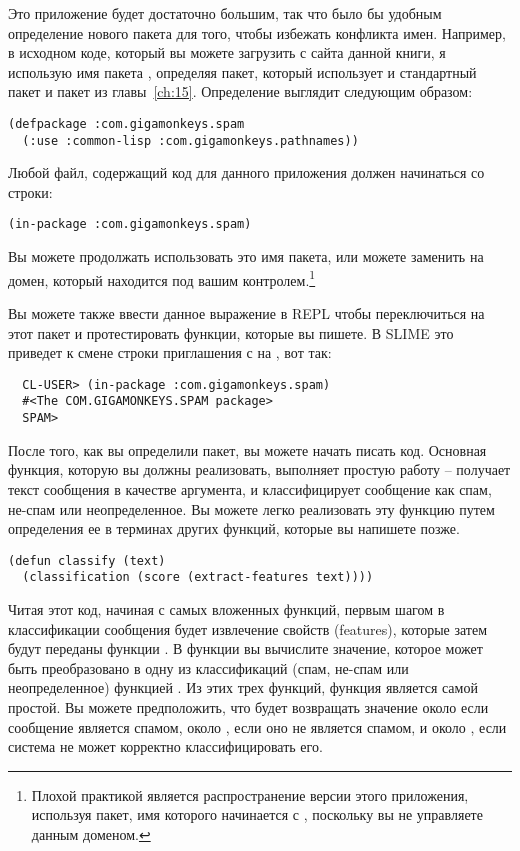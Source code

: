 Это приложение будет достаточно большим, так что было бы удобным определение нового пакета
для того, чтобы избежать конфликта имен.  Например, в исходном коде, который вы можете
загрузить с сайта данной книги, я использую имя пакета ,
определяя пакет, который использует и стандартный пакет  и пакет
 из главы~\ref{ch:15}.  Определение выглядит следующим
образом:

\begin{lstlisting}
(defpackage :com.gigamonkeys.spam
  (:use :common-lisp :com.gigamonkeys.pathnames))
\end{lstlisting}

Любой файл, содержащий код для данного приложения должен начинаться со строки:

\begin{lstlisting}
(in-package :com.gigamonkeys.spam)
\end{lstlisting}

Вы можете продолжать использовать это имя пакета, или можете заменить
 на домен, который находится под вашим контролем.\footnote{Плохой
  практикой является распространение версии этого приложения, используя пакет, имя
  которого начинается с , поскольку вы не управляете данным
  доменом.}

Вы можете также ввести данное выражение в REPL чтобы переключиться на этот пакет и
протестировать функции, которые вы пишете.  В SLIME это приведет к смене строки
приглашения с  на , вот так:

\begin{verbatim}
  CL-USER> (in-package :com.gigamonkeys.spam)
  #<The COM.GIGAMONKEYS.SPAM package>
  SPAM> 
\end{verbatim}

После того, как вы определили пакет, вы можете начать писать код.  Основная функция,
которую вы должны реализовать, выполняет простую работу -- получает текст сообщения в
качестве аргумента, и классифицирует сообщение как спам, не-спам или неопределенное.  Вы
можете легко реализовать эту функцию путем определения ее в терминах других функций,
которые вы напишете позже.

\begin{lstlisting}
(defun classify (text)
  (classification (score (extract-features text))))
\end{lstlisting}

Читая этот код, начиная с самых вложенных функций, первым шагом в классификации сообщения
будет извлечение свойств (features), которые затем будут переданы функции .  В
функции  вы вычислите значение, которое может быть преобразовано в одну из
классификаций (спам, не-спам или неопределенное) функцией .  Из этих
трех функций, функция  является самой простой. Вы можете
предположить, что  будет возвращать значение около  если сообщение
является спамом, около , если оно не является спамом, и около , если
система не может корректно классифицировать его.

